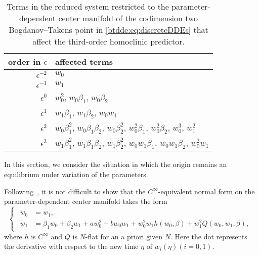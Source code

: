 \begin{table}
\begin{center}
\begingroup
\renewcommand*{\arraystretch}{1.4}
\begin{tabular}{rl}
\hline
order in $\epsilon$ & affected terms \\
\hline%
\(\epsilon^{-2}\) & $w_0$ \\
\(\epsilon^{-1}\) & $w_1$ \\
\(\epsilon^0\)    & $w_0^2$, $w_0 \beta_1$, $w_0 \beta_2$ \\
\(\epsilon^1\)    & $w_1\beta_1$, $w_1\beta_2$, $w_0w_1$ \\
\(\epsilon^2\)    & $w_0\beta_1^{2}$, $w_0\beta_1\beta_2$, $w_0\beta_2^{2}$, $w_0^{2}\beta_1$, $w_0^{2}\beta_2$, $w_0^{3}$, $w_1^{2}$ \\
\(\epsilon^3\)    & $w_1\beta_1^{2}$, $w_1\beta_1\beta_2$, $w_1\beta_2^{2}$, $w_0 w_1\beta_1$, $w_0w_1\beta_2$,  $w_0^{2}w_1$

\\[0.2cm]
\hline
\end{tabular}
\endgroup
\caption{
Terms in the reduced system restricted to the parameter-dependent center manifold of the
codimension two Bogdanov--Takens point in \cref{btdde:eq:discreteDDEs} that affect the third-order homoclinic predictor.} 
\label{btdde:table:terms_affecting_predicor}
\end{center}
\end{table}
%
In this section, we consider the situation in which the origin remains an equilibrium
under variation of the parameters.

Following~\cite{Broer1991}, it is not difficult to show that the $C^\infty$-equivalent normal form on the parameter-dependent
center manifold takes the form
\begin{equation}
\label{btdde:eq:normal_form_orbital_tbt}
\begin{cases}
\begin{aligned}
    \dot w_0 & =  w_1, \\
    \dot w_1 & =  \beta_1 w_0 + \beta_2 w_1 + aw_0^2 + b w_0 w_1 + w_0^2 w_1 h(w_0,\beta) + w_1^2 Q(w_0,w_1,\beta),
\end{aligned}
\end{cases}
\end{equation}
where $h$ is $C^\infty$ and $Q$ is $N$-flat for an a priori given $N$. Here
the dot represents the derivative with respect to the new time $\eta$ of
$w_i(\eta)(i = 0,1)$. 

